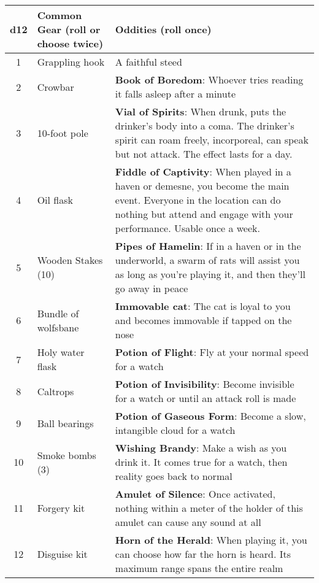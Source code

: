 \begin{adjustbox}{width=\textwidth, center}
    \small
    \begin{tabularx}{\textwidth}{|c|p{}|X|}
    \hline
    \textbf{d12} & \textbf{Common Gear (roll or choose twice)} & \textbf{Oddities (roll once)} \\
    \hline
    1 & Grappling hook & A faithful steed \\
    \hline
    2 & Crowbar & \textbf{Book of Boredom}: Whoever tries reading it falls asleep after a minute \\
    \hline
    3 & 10-foot pole & \textbf{Vial of Spirits}: When drunk, puts the drinker's body into a coma. The drinker's spirit can roam freely, incorporeal, can speak but not attack. The effect lasts for a day.\\
    \hline
    4 & Oil flask & \textbf{Fiddle of Captivity}: When played in a haven or demesne, you become the main event. Everyone in the location can do nothing but attend and engage with your performance. Usable once a week.\\
    \hline
    5 & Wooden Stakes (10) & \textbf{Pipes of Hamelin}: If in a haven or in the underworld, a swarm of rats will assist you as long as you're playing it, and then they'll go away in peace\\
    \hline
    6 & Bundle of wolfsbane & \textbf{Immovable cat}: The cat is loyal to you and becomes immovable if tapped on the nose \\
    \hline
    7 & Holy water flask & \textbf{Potion of Flight}: Fly at your normal speed for a watch\\
    \hline
    8 & Caltrops & \textbf{Potion of Invisibility}: Become invisible for a watch or until an attack roll is made \\
    \hline
    9 & Ball bearings & \textbf{Potion of Gaseous Form}: Become a slow, intangible cloud for a watch \\
    \hline
    10 & Smoke bombs (3) & \textbf{Wishing Brandy}: Make a wish as you drink it. It comes true for a watch, then reality goes back to normal\\
    \hline
    11 & Forgery kit & \textbf{Amulet of Silence}: Once activated, nothing within a meter of the holder of this amulet can cause any sound at all\\
    \hline
    12 & Disguise kit & \textbf{Horn of the Herald}: When playing it, you can choose how far the horn is heard. Its maximum range spans the entire realm\\
    \hline
    \end{tabularx}
\end{adjustbox}